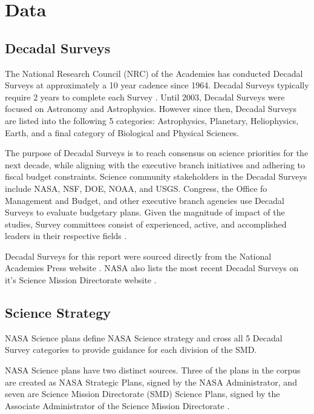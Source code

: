 \documentclass[preprint,12pt]{elsarticle}
\begin{document}
\section{Data}
\label{data}
\subsection{Decadal Surveys}
The National Research Council (NRC) of the Academies has conducted Decadal Surveys at approximately a 10 year cadence since 1964. Decadal Surveys typically require 2 years to complete each Survey \cite{Academies2015_lessons}. Until 2003, Decadal Surveys were focused on Astronomy and Astrophysics. However since then, Decadal Surveys are listed into the following 5 categories: Astrophysics, Planetary, Heliophysics, Earth, and a final category of Biological and Physical Sciences.

The purpose of Decadal Surveys is to reach consensus on science priorities for the next decade, while aligning with the executive branch initiatives and adhering to fiscal budget constraints. Science community stakeholders in the Decadal Surveys include NASA, NSF, DOE, NOAA, and USGS. Congress, the Office fo Management and Budget, and other executive branch agencies use Decadal Surveys to evaluate budgetary plans. Given the magnitude of impact of the studies, Survey committees consist of experienced, active, and accomplished leaders in their respective fields \cite{Academies2015_lessons}.

Decadal Surveys for this report were sourced directly from the National Academies Press website \cite{Academies_Decadal}. NASA also lists the most recent Decadal Surveys on it's Science Mission Directorate website \cite{NASA_Decadal}.

\subsection{Science Strategy}
NASA Science plans define NASA Science strategy and cross all 5 Decadal Survey categories to provide guidance for each division of the SMD. 

NASA Science plans have two distinct sources. Three of the plans in the corpus are created as NASA Strategic Plans, signed by the NASA Administrator, and seven are Science Mission Directorate (SMD) Science Plans, signed by the Associate Administrator of the Science Mission Directorate\cite{SMD_2007} \cite{SMD_2010} \cite{NSP_2011} \cite{SMD_2014} \cite{NSP_2018} \cite{SMD_2020} \cite{NSP_2022} \cite{SMD_2022} \cite{SMD_2023} \cite{SMD_2025}.
\end{document}
